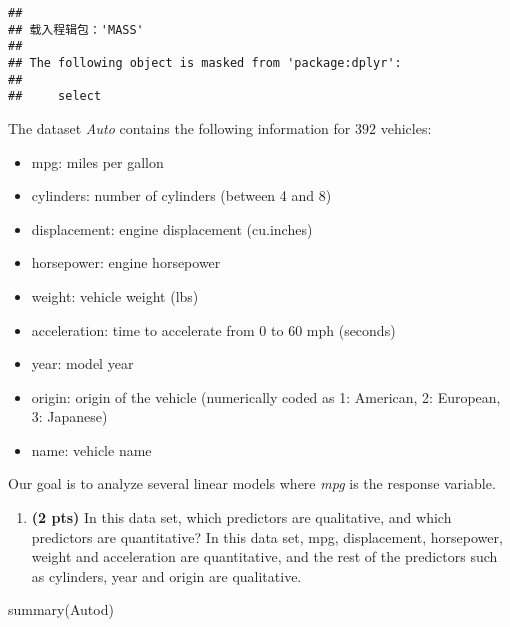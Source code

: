 \documentclass[
]{article}
\newenvironment{Shaded}{\begin{snugshade}}{\end{snugshade}}
\newcommand{\FunctionTok}[1]{\textcolor[rgb]{0.00,0.00,0.00}{#1}}
\newcommand{\NormalTok}[1]{#1}
\providecommand{\tightlist}{%
  \setlength{\itemsep}{0pt}\setlength{\parskip}{0pt}}
\begin{document}
\begin{verbatim}
## 
## 载入程辑包：'MASS'
## 
## The following object is masked from 'package:dplyr':
## 
##     select
\end{verbatim}

The dataset \emph{Auto} contains the following information for \(392\)
vehicles:

\begin{itemize}
\tightlist
\item
  mpg: miles per gallon
\item
  cylinders: number of cylinders (between 4 and 8)
\item
  displacement: engine displacement (cu.inches)
\item
  horsepower: engine horsepower
\item
  weight: vehicle weight (lbs)
\item
  acceleration: time to accelerate from 0 to 60 mph (seconds)
\item
  year: model year
\item
  origin: origin of the vehicle (numerically coded as 1: American, 2:
  European, 3: Japanese)
\item
  name: vehicle name
\end{itemize}

Our goal is to analyze several linear models where \emph{mpg} is the
response variable.\\

\begin{enumerate}
\def\labelenumi{(\alph{enumi})}
\tightlist
\item
  \textbf{(2 pts)} In this data set, which predictors are qualitative,
  and which predictors are quantitative? In this data set, mpg,
  displacement, horsepower, weight and acceleration are quantitative,
  and the rest of the predictors such as cylinders, year and origin are
  qualitative.
\end{enumerate}

\begin{Shaded}
\begin{Highlighting}[]
\FunctionTok{summary}\NormalTok{(Autod)}
\end{Highlighting}
\end{Shaded}
\end{document}
